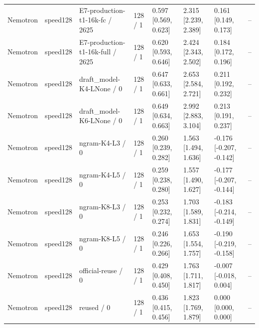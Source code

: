\begin{tabular}{llllllll}
Nemotron & speed128 & E7-production-t1-16k-fc / 2625 & 128 / 1 & 0.597 [0.569, 0.623] & 2.315 [2.239, 2.389] & 0.161 [0.149, 0.173] & -- \\
Nemotron & speed128 & E7-production-t1-16k-full / 2625 & 128 / 1 & 0.620 [0.593, 0.646] & 2.424 [2.343, 2.502] & 0.184 [0.172, 0.196] & -- \\
Nemotron & speed128 & draft\_model-K4-LNone / 0 & 128 / 1 & 0.647 [0.633, 0.661] & 2.653 [2.584, 2.721] & 0.211 [0.192, 0.232] & -- \\
Nemotron & speed128 & draft\_model-K6-LNone / 0 & 128 / 1 & 0.649 [0.634, 0.663] & 2.992 [2.883, 3.104] & 0.213 [0.191, 0.237] & -- \\
Nemotron & speed128 & ngram-K4-L3 / 0 & 128 / 1 & 0.260 [0.239, 0.282] & 1.563 [1.494, 1.636] & -0.176 [-0.207, -0.142] & -- \\
Nemotron & speed128 & ngram-K4-L5 / 0 & 128 / 1 & 0.259 [0.238, 0.280] & 1.557 [1.490, 1.627] & -0.177 [-0.207, -0.144] & -- \\
Nemotron & speed128 & ngram-K8-L3 / 0 & 128 / 1 & 0.253 [0.232, 0.274] & 1.703 [1.589, 1.831] & -0.183 [-0.214, -0.149] & -- \\
Nemotron & speed128 & ngram-K8-L5 / 0 & 128 / 1 & 0.246 [0.226, 0.266] & 1.653 [1.554, 1.757] & -0.190 [-0.219, -0.158] & -- \\
Nemotron & speed128 & official-reuse / 0 & 128 / 1 & 0.429 [0.408, 0.450] & 1.763 [1.711, 1.817] & -0.007 [-0.018, 0.004] & -- \\
Nemotron & speed128 & reused / 0 & 128 / 1 & 0.436 [0.415, 0.456] & 1.823 [1.769, 1.879] & 0.000 [0.000, 0.000] & -- \\
\hline
\end{tabular}
